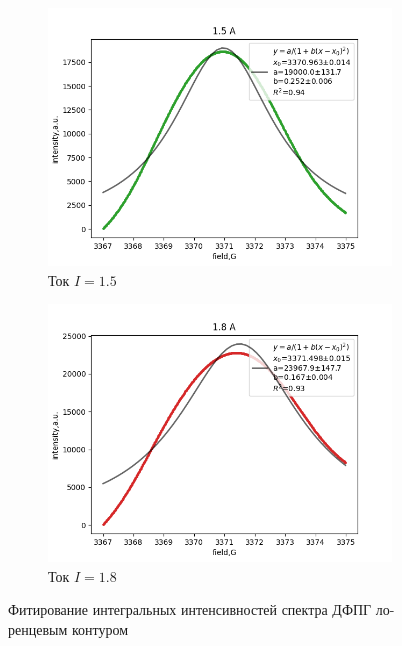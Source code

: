 \documentclass{article}
\begin{document}
\begin{figure}[h!]
  \begin{subfigure}[b]{0.3\linewidth}
    \includegraphics[width=\linewidth]{1/13.png}
    \caption{Ток $I = 1.5$}
  \end{subfigure}
  \begin{subfigure}[b]{0.3\linewidth}
    \includegraphics[width=\linewidth]{1/15.png}
    \caption{Ток $I = 1.8$}
  \end{subfigure}
  \caption{Фитирование интегральных интенсивностей спектра ДФПГ ло-
ренцевым контуром}
\label{1__}
\end{figure}
\end{document}
